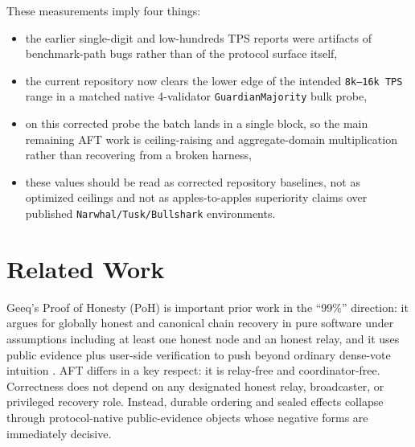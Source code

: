 \documentclass[11pt]{article}
\newcommand{\AFT}{\textsc{AFT}}
\newcommand{\code}[1]{\texttt{#1}}
\begin{document}
These measurements imply four things:

\begin{itemize}[leftmargin=1.5em]
\item the earlier single-digit and low-hundreds TPS reports were artifacts of
benchmark-path bugs rather than of the protocol surface itself,
\item the current repository now clears the lower edge of the intended
\code{8k--16k TPS} range in a matched native 4-validator
\code{GuardianMajority} bulk probe,
\item on this corrected probe the batch lands in a single block, so the main
remaining AFT work is ceiling-raising and aggregate-domain multiplication rather
than recovering from a broken harness,
\item these values should be read as corrected repository baselines, not as
optimized ceilings and not as apples-to-apples superiority claims over
published \code{Narwhal/Tusk/Bullshark} environments.
\end{itemize}

\section{Related Work}

Geeq's Proof of Honesty (PoH) is important prior work in the ``99\%'' direction:
it argues for globally honest and canonical chain recovery in pure software
under assumptions including at least one honest node and an honest relay, and
it uses public evidence plus user-side verification to push beyond ordinary
dense-vote intuition \cite{geeq}. \AFT{} differs in a key respect: it is
relay-free and coordinator-free. Correctness does not depend on any designated
honest relay, broadcaster, or privileged recovery role. Instead, durable
ordering and sealed effects collapse through protocol-native public-evidence
objects whose negative forms are immediately decisive.
\end{document}

